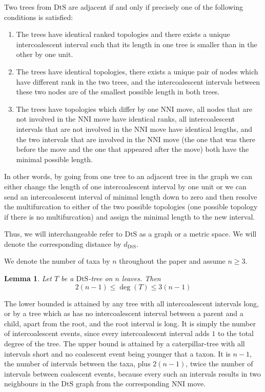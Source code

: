 \documentclass{amsart}
\newtheorem{lemma}{Lemma}
\newcommand{\dts}{\mathrm{DtS}}
\begin{document}
Two trees from $\dts$ are adjacent if and only if precisely one of the following
conditions is satisfied: 

\begin{enumerate}[(1)]
\item The trees have identical ranked topologies and there exists a unique
intercoalescent interval such that its length in one tree is smaller than in the
other by one unit. 
\item The trees have identical topologies, there exists a unique pair of nodes
which have different rank in the two trees, and the intercoalescent intervals 
between these two nodes are of the smallest possible length in both trees. 
\item The trees have topologies which differ by one NNI move, all nodes that
are not involved in the NNI move have identical ranks, all intercoalescent
intervals that are not involved in the NNI move have identical lengths, 
and the two intervals that are involved in the NNI move (the one that was there
before the move and the one that appeared after the move) both have the minimal
possible length.  
\end{enumerate}

In other words, by going from one tree to an adjacent tree in the graph we can
either change the length of one intercoalescent interval by one unit or we
can send an intercoalescent interval of minimal length down to zero and
then resolve the multifurcation to either of the two possible topologies
(one possible topology if there is no multifurcation) and
assign the minimal length to the new interval.

Thus, we will interchangeable refer to $\dts$ as a graph or a metric space. 
We will denote the corresponding distance by $d_\dts$. 

We denote the number of taxa by $n$ throughout the paper and assume $n \geq 3$.

\begin{lemma}
Let $T$ be a $\dts$-tree on $n$ leaves. Then \[2(n-1)\leq \deg(T)\leq3(n-1)\] 
\end{lemma}

\proof
The lower bounded is attained by any tree with all intercoalescent intervals 
long, or by a tree which as has no intercoalescent interval between a parent and
a child, apart from the root, and the root interval is long. It is simply the
number of intercoalescent events, since every intercoalescent interval adds $1$
to the total degree of the tree. The upper bound is attained by a 
caterpillar-tree with all intervals short and no coalescent event being younger
that a taxon. It is $n-1$, the number of intervals between the taxa, plus 
$2(n-1)$, twice the number of intervals between coalescent events, because 
every such an intervals results in two neighbours in the $\dts$ graph from
the corresponding NNI move. 
\endproof
\end{document}
